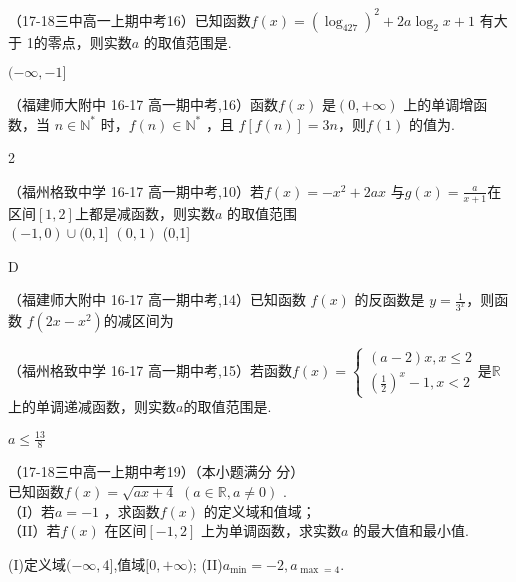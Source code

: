 \item
（17-18三中高一上期中考16）已知函数$f(x)=(\log_427)^2+2a\log_2x+1 $ 有大于 1的零点，则实数$a$ 的取值范围是\tk.
\begin{answers}
$(-\infty,-1]$
\end{answers}


\item
（福建师大附中 16-17 高一期中考,16）函数$f(x)$ 是$(0,+\infty)$ 上的单调增函数，当 $n\in \mathbb{N}^*$ 时，$f(n)\in\mathbb{N}^*$ ，且 $f[f(n) ] =3n$，则$f(1)$ 的值为\tk.\\
\begin{answers}2\end{answers}


\item
（福州格致中学 16-17 高一期中考,10）若$f(x)=-x^2+2ax $
 与$g(x)=\frac a{x+1} $在区间$[1,2] $上都是减函数，则实数$a $ 的取值范围\xz\\
 		{$(-1,0)\cup (0,1]$}
        {$(0,1) $}
        {(0,1]}
 \begin{answer}      D\end{answer}

\item
（福建师大附中 16-17 高一期中考,14）已知函数 $f(x)$ 的反函数是 $y=\frac{1}{3^x}$，则函数 $f(2x-x^2) $的减区间为\tk

\item
（福州格致中学 16-17 高一期中考,15）若函数$f(x)=\begin{cases}(a-2)x,x\leq2\\(\frac{1}{2})^x-1,x<2\end{cases}$是$\mathbb{R}$上的单调递减函数，则实数$a$的取值范围是\tk.
\begin{answers}
$a\leq\frac{13}{8}$
\end{answers}

\item
（17-18三中高一上期中考19）（本小题满分 分）\\
已知函数$f(x)=\sqrt{ax+4}$ $(a\in\mathbb{R},a\neq0)$  .\\
（I）若$a=-1$ ，求函数$f(x)$ 的定义域和值域；\\  
（II）若$f(x)$ 在区间$[-1,2] $ 上为单调函数，求实数$a$ 的最大值和最小值.\\
\begin{answers}
(I)定义域$(-\infty,4]$,值域$[0,+\infty)$;
(II)$a_{\min}=-2,a_{\max=4} $.
\end{answers}





